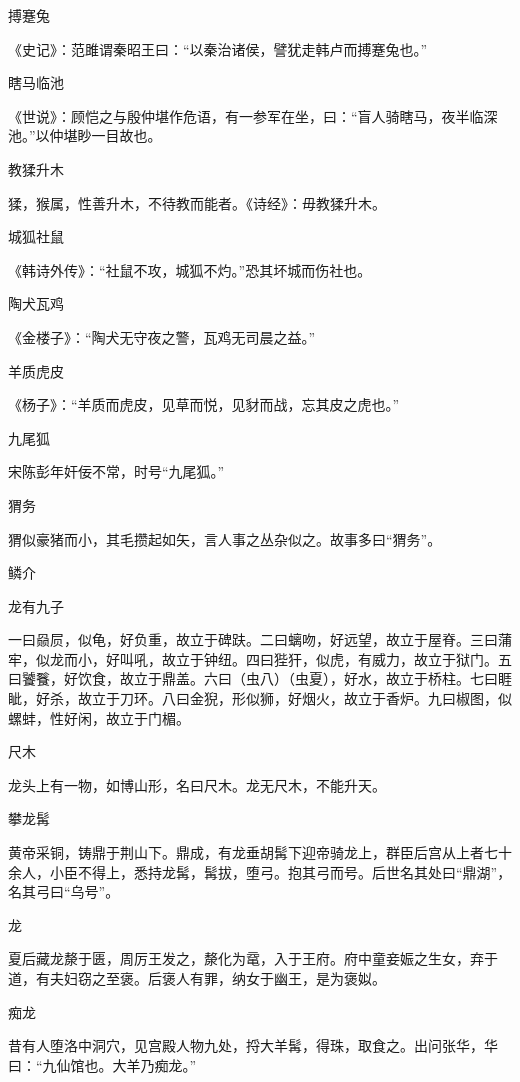 \documentclass[a4paper,12pt,UTF8,twoside]{ctexbook}
\begin{document}
    搏蹇兔
    
    《史记》：范雎谓秦昭王曰：“以秦治诸侯，譬犹走韩卢而搏蹇兔也。”
    
    瞎马临池
    
    《世说》：顾恺之与殷仲堪作危语，有一参军在坐，曰：“盲人骑瞎马，夜半临深池。”以仲堪眇一目故也。
    
    教猱升木
    
    猱，猴属，性善升木，不待教而能者。《诗经》：毋教猱升木。
    
    城狐社鼠
    
    《韩诗外传》：“社鼠不攻，城狐不灼。”恐其坏城而伤社也。
    
    陶犬瓦鸡
    
    《金楼子》：“陶犬无守夜之警，瓦鸡无司晨之益。”
    
    羊质虎皮
    
    《杨子》：“羊质而虎皮，见草而悦，见豺而战，忘其皮之虎也。”
    
    九尾狐
    
    宋陈彭年奸佞不常，时号“九尾狐。”
    
    猬务
    
    猬似豪猪而小，其毛攒起如矢，言人事之丛杂似之。故事多曰“猬务”。
    
    鳞介
    
    龙有九子
    
    一曰赑屃，似龟，好负重，故立于碑趺。二曰螭吻，好远望，故立于屋脊。三曰蒲牢，似龙而小，好叫吼，故立于钟纽。四曰狴犴，似虎，有威力，故立于狱门。五曰饕餮，好饮食，故立于鼎盖。六曰（虫八）（虫夏），好水，故立于桥柱。七曰睚眦，好杀，故立于刀环。八曰金猊，形似狮，好烟火，故立于香炉。九曰椒图，似螺蚌，性好闲，故立于门楣。
    
    尺木
    
    龙头上有一物，如博山形，名曰尺木。龙无尺木，不能升天。
    
    攀龙髯
    
    黄帝采铜，铸鼎于荆山下。鼎成，有龙垂胡髯下迎帝骑龙上，群臣后宫从上者七十余人，小臣不得上，悉持龙髯，髯拔，堕弓。抱其弓而号。后世名其处曰“鼎湖”，名其弓曰“乌号”。
    
    龙
    
    夏后藏龙漦于匮，周厉王发之，漦化为鼋，入于王府。府中童妾娠之生女，弃于道，有夫妇窃之至褒。后褒人有罪，纳女于幽王，是为褒姒。
    
    痴龙
    
    昔有人堕洛中洞穴，见宫殿人物九处，捋大羊髯，得珠，取食之。出问张华，华曰：“九仙馆也。大羊乃痴龙。”
    
\end{document}
